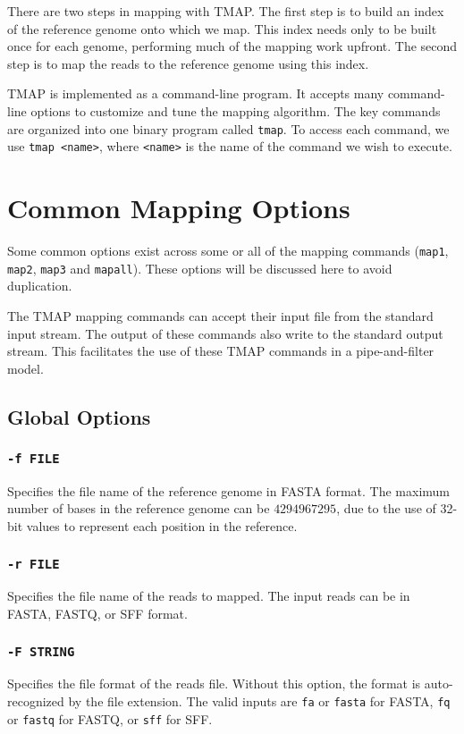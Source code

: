 \documentclass[a4paper,12pt]{book}
\newcommand{\TT}[1]{{\tt #1}} %
\begin{document}
There are two steps in mapping with TMAP.
The first step is to build an index of the reference genome onto which we map.
This index needs only to be built once for each genome, performing much of the mapping work upfront.
The second step is to map the reads to the reference genome using this index.

TMAP is implemented as a command-line program.
It accepts many command-line options to customize and tune the mapping algorithm.
The key commands are organized into one binary program called \TT{tmap}.
To access each command, we use \TT{tmap <name>}, where \TT{<name>} is the name of the command we wish to execute.

\section{Common Mapping Options}
\label{sec:commonoptions}
Some common options exist across some or all of the mapping commands (\TT{map1}, \TT{map2}, \TT{map3} and \TT{mapall}). 
These options will be discussed here to avoid duplication.

The TMAP mapping commands can accept their input file from the standard input stream.
The output of these commands also write to the standard output stream.
This facilitates the use of these TMAP commands in a pipe-and-filter model.

\subsection{Global Options}
\subsubsection{\TT{-f FILE}}
Specifies the file name of the reference genome in FASTA format.
The maximum number of bases in the reference genome can be $4294967295$, due to the use of 32-bit values to represent each position in the reference.

\subsubsection{\TT{-r FILE}}
Specifies the file name of the reads to mapped.
The input reads can be in FASTA, FASTQ, or SFF format.

\subsubsection{\TT{-F STRING}}
Specifies the file format of the reads file.
Without this option, the format is auto-recognized by the file extension.
The valid inputs are \TT{fa} or \TT{fasta} for FASTA, \TT {fq} or \TT{fastq} for FASTQ, or \TT{sff} for SFF.
\end{document}
